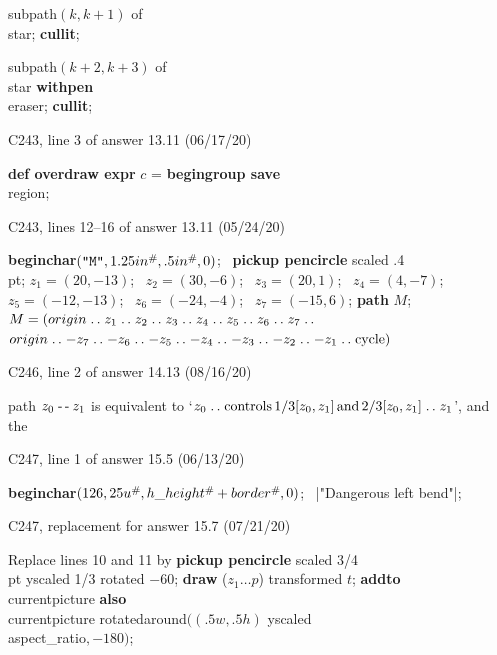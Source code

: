 \ninepoint\indent
{} subpath$(k,k+1)$ of \\{star}; {\bf cullit};\par\indent
{} subpath$(k+2,k+3)$ of \\{star} {\bf withpen}
  \\{eraser}; {\bf cullit};

\bugonpage C243, line 3 of answer 13.11 (06/17/20)

\ninepoint\indent
{\bf def overdraw expr} $c$ = {\bf begingroup save} \\{region};

\bugonpage C243, lines 12--16 of answer 13.11 (05/24/20)

\ninepoint\noindent
\begindisplay
{\bf beginchar}$(\hbox{\tt"M"},1.25\\{in}\0,.5\\{in}\0,0)$; \
 {\bf pickup pencircle} scaled .4\\{pt};\cr
$z_1=(20,-13)$; \ $z_2=(30,-6)$; \ $z_3=(20,1)$; \ $z_4=(4,-7)$;\cr
\indent $z_5=(-12,-13)$; \ $z_6=(-24,-4)$; \ $z_7=(-15,6)$;\cr
{\bf path} $M$; $M=(\\{origin}\mathrel{.\,.}
 z_1\mathrel{.\,.} z_2\mathrel{.\,.} z_3\mathrel{.\,.} z_4\mathrel{.\,.} z_5\mathrel{.\,.} z_6\mathrel{.\,.} z_7\mathrel{.\,.}$\cr
\indent$\\{origin}\mathrel{.\,.} -z_7\mathrel{.\,.} -z_6\mathrel{.\,.} -z_5\mathrel{.\,.} -z_4\mathrel{.\,.}
  -z_3\mathrel{.\,.} -z_2\mathrel{.\,.} -z_1\mathrel{.\,.}\hbox{\rm cycle})$\cr
\enddisplay

\bugonpage C246, line 2 of answer 14.13 (08/16/20)

\ninepoint\noindent
path $z_0\mathrel{\hbox{-\thinspace-\kern-.05em}} z_1$ is equivalent to `$z_0\mathrel{.\,.}
\mathop{\rm controls}1/3[z_0,z_1]\,{\rm and}\,2/3[z_0,z_1]\mathrel{.\,.} z_1$', and the\cutpar

\bugonpage C247, line 1 of answer 15.5 (06/13/20)

\ninepoint\noindent
{}\enspace
{\bf beginchar}$(126,25u\0,\\{h\_height}\0+\\{border}\0,0)$; \
|"Dangerous left bend"|;

\bugonpage C247, replacement for answer 15.7 (07/21/20)

\ninepoint\noindent
{}\enspace
Replace lines 10 and 11 by
\begindisplay
{\bf pickup pencircle} scaled 3/4\\{pt} yscaled 1/3 rotated $-60$;\cr
{\bf draw} ($z_1\ldots p$) transformed $t$;\cr
{\bf addto} \\{currentpicture} {\bf also} \\{currentpicture}\cr
\qquad rotatedaround$\bigl((.5w,.5h)$ yscaled \\{aspect\_ratio}$,-180\bigr)$;\cr
\enddisplay


